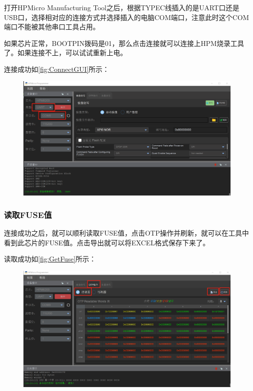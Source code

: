 打开HPMicro Manufacturing Tool之后，根据TYPEC线插入的是UART口还是USB口，选择相对应的连接方式并选择插入的电脑COM端口，注意此时这个COM端口不能被其他串口工具占用。\par
如果芯片正常，BOOTPIN拨码是01，那么点击连接就可以连接上HPM烧录工具了。如果连接不上，可以试试重新上电。\par
连接成功如\autoref{fig:ConnectGUI}所示：\par
\vspace{\baselineskip}
\vspace{0.4cm}
\begin{figure}[H]
	\centering
	\includegraphics[width=0.7\linewidth]{img/ConnectGUI}
	\caption{}
	\label{fig:ConnectGUI}
\end{figure}

\vspace{\baselineskip}
\vspace{0.5cm} 


\subsubsection{读取FUSE值}
连接成功之后，就可以顺利读取FUSE值，点击OTP操作并刷新，就可以在工具中看到此芯片的FUSE值。点击导出就可以将EXCEL格式保存下来了。\par
读取成功如\autoref{fig:GetFuse}所示：\par
\vspace{\baselineskip}
\vspace{0.4cm}
\begin{figure}[H]
	\centering
	\includegraphics[width=0.9\linewidth]{img/GetFuse}
	\caption{}
	\label{fig:GetFuse}
\end{figure}

